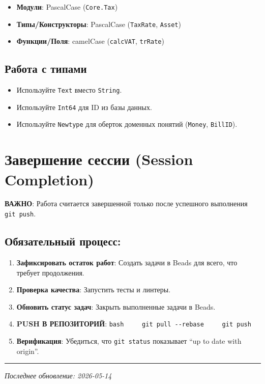 \begin{itemize}
\tightlist
\item
  \textbf{Модули}: PascalCase (\texttt{Core.Tax})
\item
  \textbf{Типы/Конструкторы}: PascalCase (\texttt{TaxRate},
  \texttt{Asset})
\item
  \textbf{Функции/Поля}: camelCase (\texttt{calcVAT}, \texttt{trRate})
\end{itemize}

\subsection{Работа с
типами}\label{ux440ux430ux431ux43eux442ux430-ux441-ux442ux438ux43fux430ux43cux438}

\begin{itemize}
\tightlist
\item
  Используйте \texttt{Text} вместо \texttt{String}.
\item
  Используйте \texttt{Int64} для ID из базы данных.
\item
  Используйте \texttt{Newtype} для оберток доменных понятий
  (\texttt{Money}, \texttt{BillID}).
\end{itemize}

\section{Завершение сессии (Session
Completion)}\label{ux437ux430ux432ux435ux440ux448ux435ux43dux438ux435-ux441ux435ux441ux441ux438ux438-session-completion}

\textbf{ВАЖНО}: Работа считается завершенной только после успешного
выполнения \texttt{git\ push}.

\subsection{Обязательный
процесс:}\label{ux43eux431ux44fux437ux430ux442ux435ux43bux44cux43dux44bux439-ux43fux440ux43eux446ux435ux441ux441}

\begin{enumerate}
\def\labelenumi{\arabic{enumi}.}
\tightlist
\item
  \textbf{Зафиксировать остаток работ}: Создать задачи в Beads для
  всего, что требует продолжения.
\item
  \textbf{Проверка качества}: Запустить тесты и линтеры.
\item
  \textbf{Обновить статус задач}: Закрыть выполненные задачи в Beads.
\item
  \textbf{PUSH В РЕПОЗИТОРИЙ}:
  \texttt{bash\ \ \ \ \ git\ pull\ -\/-rebase\ \ \ \ \ git\ push}
\item
  \textbf{Верификация}: Убедиться, что \texttt{git\ status} показывает
  ``up to date with origin''.
\end{enumerate}

\begin{center}\rule{0.5\linewidth}{0.5pt}\end{center}

\emph{Последнее обновление: 2026-05-14}
